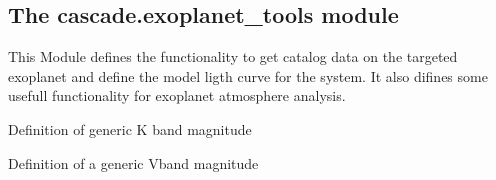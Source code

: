 \documentclass[a4paper,11pt,english]{sphinxmanual}
\begin{document}
\subsection{The cascade.exoplanet\_tools module}
\label{\detokenize{cascade.exoplanet_tools:module-cascade.exoplanet_tools.exoplanet_tools}}\label{\detokenize{cascade.exoplanet_tools:the-cascade-exoplanet-tools-module}}\label{\detokenize{cascade.exoplanet_tools::doc}}
This Module defines the functionality to get catalog data on the targeted
exoplanet and define the model ligth curve for the system.
It also difines some usefull functionality for exoplanet atmosphere analysis.

\begin{fulllineitems}
\label{\detokenize{cascade.exoplanet_tools:cascade.exoplanet_tools.exoplanet_tools.Kmag}}
Definition of generic K band magnitude

\end{fulllineitems}


\begin{fulllineitems}
\label{\detokenize{cascade.exoplanet_tools:cascade.exoplanet_tools.exoplanet_tools.Vmag}}
Definition of a generic Vband magnitude

\end{fulllineitems}

\end{document}
